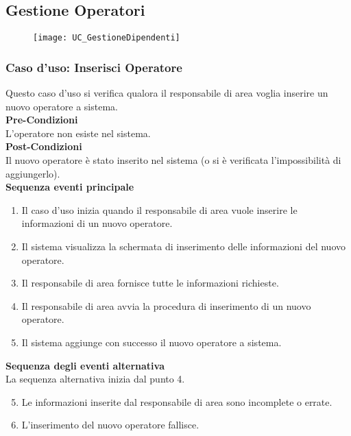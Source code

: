 \documentclass[green, fancy, 11pt]{elegantbook}
\begin{document}
\subsection{Gestione Operatori}
\begin{figure}[H]
	\texttt{[image: UC\_GestioneDipendenti]}
\end{figure}

\subsubsection{Caso d'uso: Inserisci Operatore}
\noindent
Questo caso d’uso si verifica qualora il responsabile di area voglia inserire un nuovo operatore a sistema.\\
\textbf{Pre-Condizioni}\\
L’operatore non esiste nel sistema.\\
\textbf{Post-Condizioni}\\
Il nuovo operatore è stato inserito nel sistema (o si è verificata l’impossibilità di aggiungerlo).\\
\textbf{Sequenza eventi principale}
\begin{enumerate}
	\item Il caso d’uso inizia quando il responsabile di area vuole inserire le informazioni di un nuovo operatore.
	\item Il sistema visualizza la schermata di inserimento delle informazioni del nuovo operatore.
	\item Il responsabile di area fornisce tutte le informazioni richieste.
	\item Il responsabile di area avvia la procedura di inserimento di un nuovo operatore.
	\item Il sistema aggiunge con successo il nuovo operatore a sistema.
\end{enumerate}
\textbf{Sequenza degli eventi alternativa}\\
La sequenza alternativa inizia dal punto 4.
\begin{enumerate}
	\setcounter{enumi}{4}
	\item Le informazioni inserite dal responsabile di area sono incomplete o errate.
	\item L’inserimento del nuovo operatore fallisce.
\end{enumerate}
\newpage
\end{document}
